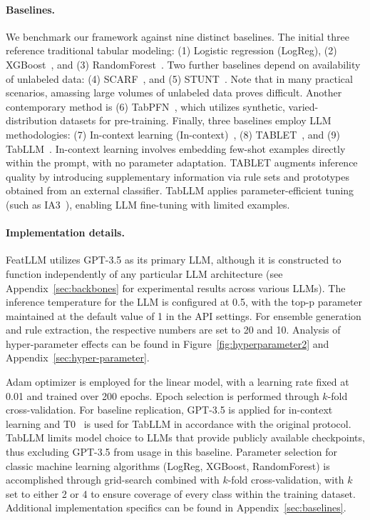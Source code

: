 \vspace*{-0.12in}
\paragraph{Baselines.}
We benchmark our framework against nine distinct baselines. The initial three reference traditional tabular modeling: (1) Logistic regression (LogReg), (2) XGBoost~\cite{chen2016xgboost}, and (3) RandomForest~\cite{ho1995random}. Two further baselines depend on availability of unlabeled data: (4) SCARF~\cite{bahri2022scarf}, and (5) STUNT~\cite{nam2023stunt}. Note that in many practical scenarios, amassing large volumes of unlabeled data proves difficult. Another contemporary method is (6) TabPFN~\cite{hollmann2022tabpfn}, which utilizes synthetic, varied-distribution datasets for pre-training. Finally, three baselines employ LLM methodologies: (7) In-context learning (In-context)~\cite{wei2022emergent}, (8) TABLET~\cite{slack2023tablet}, and (9) TabLLM~\cite{hegselmann2023tabllm}. In-context learning involves embedding few-shot examples directly within the prompt, with no parameter adaptation. TABLET augments inference quality by introducing supplementary information via rule sets and prototypes obtained from an external classifier. TabLLM applies parameter-efficient tuning (such as IA3~\cite{liu2022few}), enabling LLM fine-tuning with limited examples.

\vspace*{-0.12in}
\paragraph{Implementation details.}
\textsf{FeatLLM} utilizes GPT-3.5 as its primary LLM, although it is constructed to function independently of any particular LLM architecture (see Appendix~\ref{sec:backbones} for experimental results across various LLMs). The inference temperature for the LLM is configured at 0.5, with the top-p parameter maintained at the default value of 1 in the API settings. For ensemble generation and rule extraction, the respective numbers are set to 20 and 10. Analysis of hyper-parameter effects can be found in Figure~\ref{fig:hyperparameter2} and Appendix~\ref{sec:hyper-parameter}. 

Adam optimizer is employed for the linear model, with a learning rate fixed at 0.01 and trained over 200 epochs. Epoch selection is performed through $k$-fold cross-validation. For baseline replication, GPT-3.5 is applied for in-context learning and T0~\cite{sanh2022multitask} is used for TabLLM in accordance with the original protocol. TabLLM limits model choice to LLMs that provide publicly available checkpoints, thus excluding GPT-3.5 from usage in this baseline. Parameter selection for classic machine learning algorithms (LogReg, XGBoost, RandomForest) is accomplished through grid-search combined with $k$-fold cross-validation, with $k$ set to either 2 or 4 to ensure coverage of every class within the training dataset. Additional implementation specifics can be found in Appendix~\ref{sec:baselines}.

